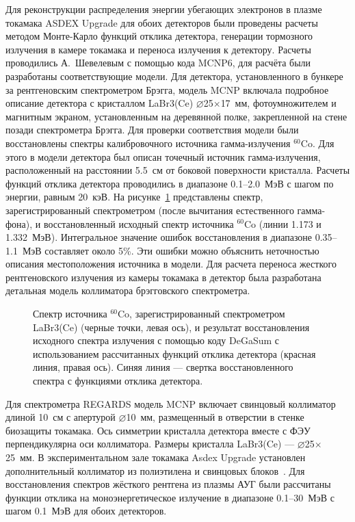 Для реконструкции распределения энергии убегающих электронов в плазме токамака ASDEX Upgrade для обоих детекторов были проведены расчеты методом Монте-Карло функций отклика детектора, генерации тормозного излучения в камере токамака и переноса излучения к детектору. Расчеты проводились А.~Шевелевым с помощью кода MCNP6, для расчёта были разработаны соответствующие модели. Для детектора, установленного в бункере за рентгеновским спектрометром Брэгга, модель MCNP включала подробное описание детектора с кристаллом LaBr3(Ce) $\varnothing$25$\times$17~мм, фотоумножителем и магнитным экраном, установленным на деревянной полке, закрепленной на стене позади спектрометра Брэгга. Для проверки соответствия модели были восстановлены спектры калибровочного источника гамма-излучения ${}^{60}$Co. Для этого в модели детектора был описан точечный источник гамма-излучения, расположенный на расстоянии 5.5~см от боковой поверхности кристалла. Расчеты функций отклика детектора проводились в диапазоне 0.1--2.0~МэВ с шагом по энергии, равным 20~кэВ. На рисунке~\ref{fig:asdex60CoRecostructionBragg} представлены спектр, зарегистрированный спектрометром (после вычитания естественного гамма-фона), и восстановленный исходный спектр источника ${}^{60}$Co (линии 1.173 и 1.332~МэВ). Интегральное значение ошибок восстановления в диапазоне 0.35--1.1~МэВ составляет около 5\%. Эти ошибки можно объяснить неточностью описания местоположения источника в модели. Для расчета переноса жесткого рентгеновского излучения из камеры токамака в детектор была разработана детальная модель коллиматора брэгговского спектрометра.~\cite{Shevelev2021}

\begin{figure}[ht!]
  \caption{ Спектр источника ${}^{60}$Co, зарегистрированный спектрометром LaBr3(Ce) (черные точки, левая ось), и результат восстановления исходного спектра излучения с помощью коду DeGaSum с использованием рассчитанных функций отклика детектора (красная линия, правая ось). Синяя линия --- свертка восстановленного спектра с функциями отклика детектора.~\cite{Shevelev2021} }
  \label{fig:asdex60CoRecostructionBragg}
\end{figure}

Для спектрометра REGARDS модель MCNP включает свинцовый коллиматор длиной 10~см с апертурой $\varnothing$10~мм, размещенный в отверстии в стенке биозащиты токамака. Ось симметрии кристалла детектора вместе с ФЭУ перпендикулярна оси коллиматора. Размеры кристалла LaBr3(Ce) --- $\varnothing$25$\times$25~мм. В экспериментальном зале токамака Asdex Upgrade установлен дополнительный коллиматор из полиэтилена и свинцовых блоков~\cite{Tardini2012}. Для восстановления спектров жёсткого рентгена из плазмы АУГ были рассчитаны функции отклика на моноэнергетическое излучение в диапазоне 0.1--30~МэВ с шагом 0.1~МэВ для обоих детекторов. 

